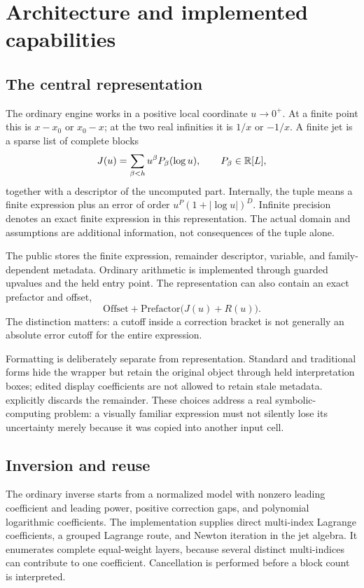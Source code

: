 \section{Architecture and implemented capabilities}
\subsection{The central representation}
The ordinary engine works in a positive local coordinate $u\to0^+$. At a finite point this is $x-x_0$ or $x_0-x$; at the two real infinities it is $1/x$ or $-1/x$. A finite jet is a sparse list of complete blocks
\[
 J(u)=\sum_{\beta<h}u^\beta P_\beta(\log u),
 \qquad P_\beta\in\mathbb R[L],
\]
together with a descriptor of the uncomputed part. Internally, the tuple  means a finite expression plus an error of order $u^P(1+|\log u|)^D$. Infinite precision denotes an exact finite expression in this representation. The actual domain and assumptions are additional information, not consequences of the tuple alone.\cite{core,operations}

The public  stores the finite expression, remainder descriptor, variable, and family-dependent metadata. Ordinary arithmetic is implemented through guarded upvalues and the held  entry point. The representation can also contain an exact prefactor and offset,
\[
 \text{Offset}+\text{Prefactor}\bigl(J(u)+R(u)\bigr).
\]
The distinction matters: a cutoff inside a correction bracket is not generally an absolute error cutoff for the entire expression.\cite{operations,arithmetic,guide}

Formatting is deliberately separate from representation. Standard and traditional forms hide the wrapper but retain the original object through held interpretation boxes; edited display coefficients are not allowed to retain stale metadata.  explicitly discards the remainder. These choices address a real symbolic-computing problem: a visually familiar expression must not silently lose its uncertainty merely because it was copied into another input cell.\cite{core,guide}

\subsection{Inversion and reuse}
The ordinary inverse starts from a normalized model with nonzero leading coefficient and leading power, positive correction gaps, and polynomial logarithmic coefficients. The implementation supplies direct multi-index Lagrange coefficients, a grouped Lagrange route, and Newton iteration in the jet algebra. It enumerates complete equal-weight layers, because several distinct multi-indices can contribute to one coefficient. Cancellation is performed before a block count is interpreted.\cite{core,incremental}

